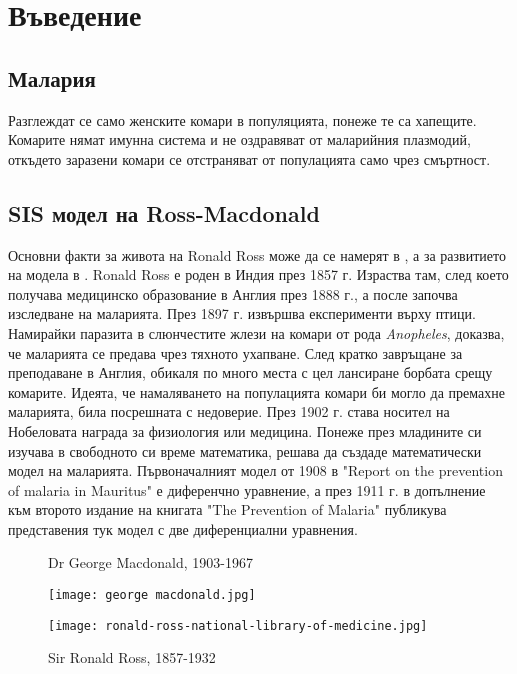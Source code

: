 \section{Въведение}
\subsection{Малария}
Разглеждат се само женските комари в популяцията, понеже те са хапещите.
Комарите нямат имунна система и не оздравяват от маларийния плазмодий, откъдето заразени комари се отстраняват от популацията само чрез смъртност.

\subsection{SIS модел на Ross-Macdonald}

Основни факти за живота на Ronald Ross може да се намерят в \cite[12]{Bacaer2011}, а за развитието на модела в \cite{Smith2012}.
Ronald Ross е роден в Индия през 1857 г.
Израства там, след което получава медицинско образование в Англия през 1888 г., а после започва изследване на маларията.
През 1897 г. извършва експерименти върху птици.
Намирайки паразита в слюнчестите жлези на комари от рода \textit{Anopheles}, доказва, че маларията се предава чрез тяхното ухапване.
След кратко завръщане за преподаване в Англия, обикаля по много места с цел лансиране борбата срещу комарите. Идеята, че намаляването на популацията комари би могло да премахне маларията, била посрешната с недоверие.
През 1902 г. става носител на Нобеловата награда за физиология или медицина.
Понеже през младините си изучава в свободното си време математика, решава да създаде математически модел на маларията.
Първоначалният модел от 1908 в "Report on the prevention of malaria in Mauritus" е диференчно уравнение, а през 1911 г. в допълнение към второто издание на книгата "The Prevention of Malaria" публикува представения тук модел с две диференциални уравнения.



\begin{figure}[h]
  \centering
  \begin{minipage}{.5\textwidth}
    \caption{Dr George Macdonald, 1903-1967}
    \centering
    \texttt{[image: george macdonald.jpg]}
    \label{fig:Ross}
  \end{minipage}%
  \begin{minipage}{.5\textwidth}
    \caption{Sir Ronald Ross, 1857-1932}
    \centering
    \texttt{[image: ronald-ross-national-library-of-medicine.jpg]}
    \label{fig:Macdonald}
  \end{minipage}
\end{figure}

